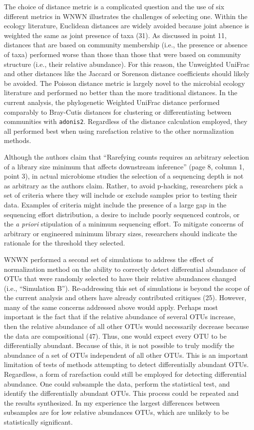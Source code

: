 \documentclass[
]{article}
\begin{document}
The choice of distance metric is a complicated question and the use of
six different metrics in WNWN illustrates the challenges of selecting
one. Within the ecology literature, Euclidean distances are widely
avoided because joint absence is weighted the same as joint presence of
taxa (31). As discussed in point 11, distances that are based on
community membership (i.e., the presence or absence of taxa) performed
worse than those than those that were based on community structure
(i.e., their relative abundance). For this reason, the Unweighted
UniFrac and other distances like the Jaccard or Sorenson distance
coefficients should likely be avoided. The Poisson distance metric is
largely novel to the microbial ecology literature and performed no
better than the more traditional distances. In the current analysis, the
phylogenetic Weighted UniFrac distance performed comparably to
Bray-Cutis distances for clustering or differentiating between
communities with \texttt{adonis2}. Regardless of the distance
calculation employed, they all performed best when using rarefaction
relative to the other normalization methods.

Although the authors claim that ``Rarefying counts requires an arbitrary
selection of a library size minimum that affects downstream inference''
(page 8, column 1, point 3), in actual microbiome studies the selection
of a sequencing depth is not as arbitrary as the authors claim. Rather,
to avoid p-hacking, researchers pick a set of criteria where they will
include or exclude samples prior to testing their data. Examples of
criteria might include the presence of a large gap in the sequencing
effort distribution, a desire to include poorly sequenced controls, or
the \emph{a priori} stipulation of a minimum sequencing effort. To
mitigate concerns of arbitrary or engineered minimum library sizes,
researchers should indicate the rationale for the threshold they
selected.

WNWN performed a second set of simulations to address the effect of
normalization method on the ability to correctly detect differential
abundance of OTUs that were randomly selected to have their relative
abundances changed (i.e., ``Simulation B''). Re-addressing this set of
simulations is beyond the scope of the current analysis and others have
already contributed critiques (25). However, many of the same concerns
addressed above would apply. Perhaps most important is the fact that if
the relative abundance of several OTUs increase, then the relative
abundance of all other OTUs would necessarily decrease because the data
are compositional (47). Thus, one would expect every OTU to be
differentially abundant. Because of this, it is not possible to truly
modify the abundance of a set of OTUs independent of all other OTUs.
This is an important limitation of tests of methods attempting to detect
differentially abundant OTUs. Regardless, a form of rarefaction could
still be employed for detecting differential abundance. One could
subsample the data, perform the statistical test, and identify the
differentially abundant OTUs. This process could be repeated and the
results synthesized. In my experience the largest differences between
subsamples are for low relative abundances OTUs, which are unlikely to
be statistically significant.
\end{document}
